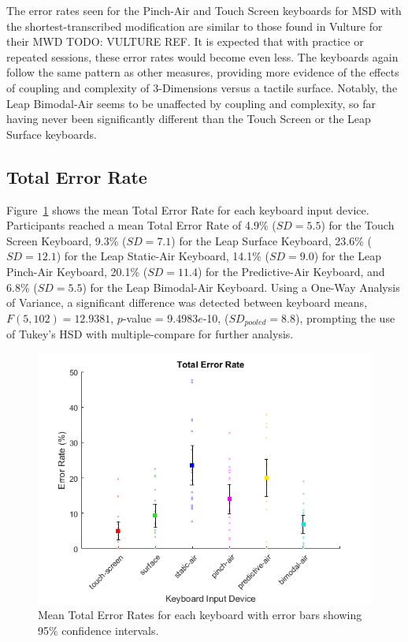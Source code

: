 The error rates seen for the Pinch-Air and Touch Screen keyboards for MSD with the shortest-transcribed modification are similar to those found in Vulture for their MWD TODO: VULTURE REF. It is expected that with practice or repeated sessions, these error rates would become even less. The keyboards again follow the same pattern as other measures, providing more evidence of the effects of coupling and complexity of 3-Dimensions versus a tactile surface. Notably, the Leap Bimodal-Air seems to be unaffected by coupling and complexity, so far having never been significantly different than the Touch Screen or the Leap Surface keyboards.

\subsection{Total Error Rate}
Figure~\ref{fig_totER_mean} shows the mean Total Error Rate for each keyboard input device. Participants reached a mean Total Error Rate of 4.9\% ($SD = 5.5$) for the Touch Screen Keyboard, 9.3\% ($SD = 7.1$) for the Leap Surface Keyboard, 23.6\% ($SD = 12.1$) for the Leap Static-Air Keyboard, 14.1\% ($SD = 9.0$) for the Leap Pinch-Air Keyboard, 20.1\% ($SD = 11.4$) for the Predictive-Air Keyboard, and 6.8\% ($SD = 5.5$) for the Leap Bimodal-Air Keyboard. Using a One-Way Analysis of Variance, a significant difference was detected between keyboard means, $F(5, 102) = 12.9381$, $p$-value = 9.4983$e$-10, ($SD_{pooled} = 8.8$), prompting the use of Tukey's HSD with multiple-compare for further analysis.

\begin{figure}[h]
	\centering
	\includegraphics{fig_totER_mean}
	\caption[Mean Total Error Rates]{Mean Total Error Rates for each keyboard with error bars showing 95\% confidence intervals.}
	\label{fig_totER_mean}
\end{figure}

